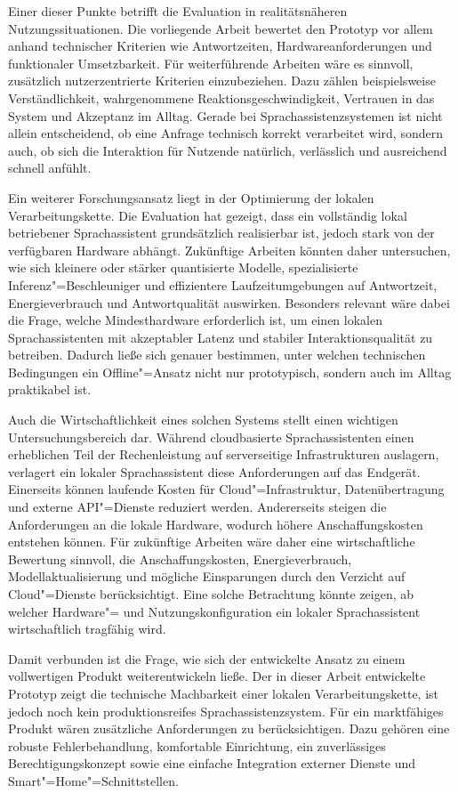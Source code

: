 Einer dieser Punkte betrifft die Evaluation in realitätsnäheren Nutzungssituationen. Die vorliegende Arbeit bewertet den Prototyp vor allem anhand technischer Kriterien wie Antwortzeiten, Hardwareanforderungen und funktionaler Umsetzbarkeit. Für weiterführende Arbeiten wäre es sinnvoll, zusätzlich nutzerzentrierte Kriterien einzubeziehen. Dazu zählen beispielsweise Verständlichkeit, wahrgenommene Reaktionsgeschwindigkeit, Vertrauen in das System und Akzeptanz im Alltag. Gerade bei Sprachassistenzsystemen ist nicht allein entscheidend, ob eine Anfrage technisch korrekt verarbeitet wird, sondern auch, ob sich die Interaktion für Nutzende natürlich, verlässlich und ausreichend schnell anfühlt.

Ein weiterer Forschungsansatz liegt in der Optimierung der lokalen Verarbeitungskette. Die Evaluation hat gezeigt, dass ein vollständig lokal betriebener Sprachassistent grundsätzlich realisierbar ist, jedoch stark von der verfügbaren Hardware abhängt. Zukünftige Arbeiten könnten daher untersuchen, wie sich kleinere oder stärker quantisierte Modelle, spezialisierte Inferenz"=Beschleuniger und effizientere Laufzeitumgebungen auf Antwortzeit, Energieverbrauch und Antwortqualität auswirken. Besonders relevant wäre dabei die Frage, welche Mindesthardware erforderlich ist, um einen lokalen Sprachassistenten mit akzeptabler Latenz und stabiler Interaktionsqualität zu betreiben. Dadurch ließe sich genauer bestimmen, unter welchen technischen Bedingungen ein Offline"=Ansatz nicht nur prototypisch, sondern auch im Alltag praktikabel ist.

Auch die Wirtschaftlichkeit eines solchen Systems stellt einen wichtigen Untersuchungsbereich dar. Während cloudbasierte Sprachassistenten einen erheblichen Teil der Rechenleistung auf serverseitige Infrastrukturen auslagern, verlagert ein lokaler Sprachassistent diese Anforderungen auf das Endgerät. Einerseits können laufende Kosten für Cloud"=Infrastruktur, Datenübertragung und externe API"=Dienste reduziert werden. Andererseits steigen die Anforderungen an die lokale Hardware, wodurch höhere Anschaffungskosten entstehen können. Für zukünftige Arbeiten wäre daher eine wirtschaftliche Bewertung sinnvoll, die Anschaffungskosten, Energieverbrauch, Modellaktualisierung und mögliche Einsparungen durch den Verzicht auf Cloud"=Dienste berücksichtigt. Eine solche Betrachtung könnte zeigen, ab welcher Hardware"= und Nutzungskonfiguration ein lokaler Sprachassistent wirtschaftlich tragfähig wird.

Damit verbunden ist die Frage, wie sich der entwickelte Ansatz zu einem vollwertigen Produkt weiterentwickeln ließe. Der in dieser Arbeit entwickelte Prototyp zeigt die technische Machbarkeit einer lokalen Verarbeitungskette, ist jedoch noch kein produktionsreifes Sprachassistenzsystem. Für ein marktfähiges Produkt wären zusätzliche Anforderungen zu berücksichtigen. Dazu gehören eine robuste Fehlerbehandlung, komfortable Einrichtung, ein zuverlässiges Berechtigungskonzept sowie eine einfache Integration externer Dienste und Smart"=Home"=Schnittstellen.
